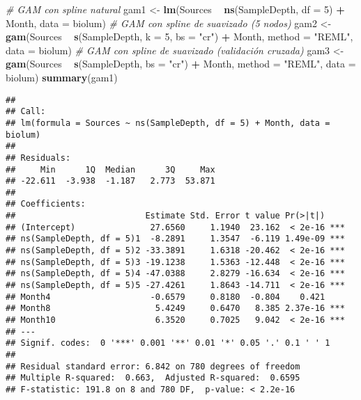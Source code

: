\documentclass[
]{book}
\newenvironment{Shaded}{\begin{snugshade}}{\end{snugshade}}
\newcommand{\CommentTok}[1]{\textcolor[rgb]{0.56,0.35,0.01}{\textit{#1}}}
\newcommand{\DataTypeTok}[1]{\textcolor[rgb]{0.13,0.29,0.53}{#1}}
\newcommand{\DecValTok}[1]{\textcolor[rgb]{0.00,0.00,0.81}{#1}}
\newcommand{\KeywordTok}[1]{\textcolor[rgb]{0.13,0.29,0.53}{\textbf{#1}}}
\newcommand{\NormalTok}[1]{#1}
\newcommand{\OperatorTok}[1]{\textcolor[rgb]{0.81,0.36,0.00}{\textbf{#1}}}
\newcommand{\StringTok}[1]{\textcolor[rgb]{0.31,0.60,0.02}{#1}}
\begin{document}
\begin{Shaded}
\begin{Highlighting}[]
\CommentTok{# GAM con spline natural}
\NormalTok{gam1 <-}\StringTok{ }\KeywordTok{lm}\NormalTok{(Sources }\OperatorTok{~}\StringTok{ }\KeywordTok{ns}\NormalTok{(SampleDepth, }\DataTypeTok{df =} \DecValTok{5}\NormalTok{) }\OperatorTok{+}\StringTok{ }\NormalTok{Month, }\DataTypeTok{data =}\NormalTok{ biolum)}
\CommentTok{# GAM con spline de suavizado (5 nodos)}
\NormalTok{gam2 <-}\StringTok{ }\KeywordTok{gam}\NormalTok{(Sources }\OperatorTok{~}\StringTok{ }\KeywordTok{s}\NormalTok{(SampleDepth, }\DataTypeTok{k =} \DecValTok{5}\NormalTok{, }\DataTypeTok{bs =} \StringTok{"cr"}\NormalTok{) }\OperatorTok{+}\StringTok{ }\NormalTok{Month, }\DataTypeTok{method =} \StringTok{"REML"}\NormalTok{, }\DataTypeTok{data =}\NormalTok{ biolum)}
\CommentTok{# GAM con spline de suavizado (validación cruzada)}
\NormalTok{gam3 <-}\StringTok{ }\KeywordTok{gam}\NormalTok{(Sources }\OperatorTok{~}\StringTok{ }\KeywordTok{s}\NormalTok{(SampleDepth, }\DataTypeTok{bs =} \StringTok{"cr"}\NormalTok{) }\OperatorTok{+}\StringTok{ }\NormalTok{Month, }\DataTypeTok{method =} \StringTok{"REML"}\NormalTok{, }\DataTypeTok{data =}\NormalTok{ biolum)}
\KeywordTok{summary}\NormalTok{(gam1)}
\end{Highlighting}
\end{Shaded}

\begin{verbatim}
## 
## Call:
## lm(formula = Sources ~ ns(SampleDepth, df = 5) + Month, data = biolum)
## 
## Residuals:
##     Min      1Q  Median      3Q     Max 
## -22.611  -3.938  -1.187   2.773  53.871 
## 
## Coefficients:
##                          Estimate Std. Error t value Pr(>|t|)    
## (Intercept)               27.6560     1.1940  23.162  < 2e-16 ***
## ns(SampleDepth, df = 5)1  -8.2891     1.3547  -6.119 1.49e-09 ***
## ns(SampleDepth, df = 5)2 -33.3891     1.6318 -20.462  < 2e-16 ***
## ns(SampleDepth, df = 5)3 -19.1238     1.5363 -12.448  < 2e-16 ***
## ns(SampleDepth, df = 5)4 -47.0388     2.8279 -16.634  < 2e-16 ***
## ns(SampleDepth, df = 5)5 -27.4261     1.8643 -14.711  < 2e-16 ***
## Month4                    -0.6579     0.8180  -0.804    0.421    
## Month8                     5.4249     0.6470   8.385 2.37e-16 ***
## Month10                    6.3520     0.7025   9.042  < 2e-16 ***
## ---
## Signif. codes:  0 '***' 0.001 '**' 0.01 '*' 0.05 '.' 0.1 ' ' 1
## 
## Residual standard error: 6.842 on 780 degrees of freedom
## Multiple R-squared:  0.663,  Adjusted R-squared:  0.6595 
## F-statistic: 191.8 on 8 and 780 DF,  p-value: < 2.2e-16
\end{verbatim}
\end{document}
